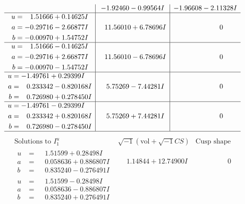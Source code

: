 \documentclass[1p]{elsarticle_modified}
\theoremstyle{definition}
\newcommand{\I}{\sqrt{-1}}
\begin{document}
$$\begin{array}{c|c|c}
 & -1.92460 - 0.99564 I & -1.96608 - 2.11328 I \\ \hline\begin{aligned}
u &= \phantom{-}1.51666 + 0.14625 I \\
a &= -0.29716 - 2.66877 I \\
b &= -0.00970 + 1.54752 I\end{aligned}
 & \phantom{-}11.56010 + 6.78696 I & \phantom{-0.000000 } 0 \\ \hline\begin{aligned}
u &= \phantom{-}1.51666 - 0.14625 I \\
a &= -0.29716 + 2.66877 I \\
b &= -0.00970 - 1.54752 I\end{aligned}
 & \phantom{-}11.56010 - 6.78696 I & \phantom{-0.000000 } 0 \\ \hline\begin{aligned}
u &= -1.49761 + 0.29399 I \\
a &= \phantom{-}0.233342 - 0.820168 I \\
b &= \phantom{-}0.726980 + 0.278450 I\end{aligned}
 & \phantom{-}5.75269 - 7.44281 I & \phantom{-0.000000 } 0 \\ \hline\begin{aligned}
u &= -1.49761 - 0.29399 I \\
a &= \phantom{-}0.233342 + 0.820168 I \\
b &= \phantom{-}0.726980 - 0.278450 I\end{aligned}
 & \phantom{-}5.75269 + 7.44281 I & \phantom{-0.000000 } 0\\
 \hline 
 \end{array}$$\newpage$$\begin{array}{c|c|c}  
\text{Solutions to }I^u_{1}& \I (\text{vol} + \sqrt{-1}CS) & \text{Cusp shape}\\
 \hline 
\begin{aligned}
u &= \phantom{-}1.51599 + 0.28498 I \\
a &= \phantom{-}0.058636 + 0.886807 I \\
b &= \phantom{-}0.835240 - 0.276491 I\end{aligned}
 & \phantom{-}1.14844 + 12.74900 I & \phantom{-0.000000 } 0 \\ \hline\begin{aligned}
u &= \phantom{-}1.51599 - 0.28498 I \\
a &= \phantom{-}0.058636 - 0.886807 I \\
b &= \phantom{-}0.835240 + 0.276491 I\end{aligned}

\end{array}$$
\end{document}
